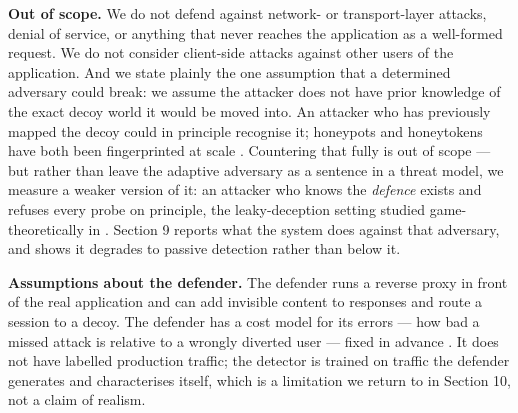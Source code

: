 \textbf{Out of scope.} We do not defend against network- or transport-layer attacks,
denial of service, or anything that never reaches the application as a
well-formed request. We do not consider client-side attacks against other users
of the application. And we state plainly the one assumption that a determined
adversary could break: we assume the attacker does not have prior knowledge of the
exact decoy world it would be moved into. An attacker who has previously mapped
the decoy could in principle recognise it; honeypots and honeytokens have both
been fingerprinted at scale \cite{vetterl2018bitter,srinivasa2020honeytoken}. Countering that fully is out of scope ---
but rather than leave the adaptive adversary as a sentence in a threat model, we
measure a weaker version of it: an attacker who knows the \emph{defence} exists and
refuses every probe on principle, the leaky-deception setting studied
game-theoretically in \cite{pawlick2019leaky}. Section 9 reports what the system does against
that adversary, and shows it degrades to passive detection rather than below it.

\textbf{Assumptions about the defender.} The defender runs a reverse proxy in front of
the real application and can add invisible content to responses and route a
session to a decoy. The defender has a cost model for its errors --- how bad a
missed attack is relative to a wrongly diverted user --- fixed in advance
\cite{elkan2001foundations}. It does
not have labelled production traffic; the detector is trained on traffic the
defender generates and characterises itself, which is a limitation we return to in
Section 10, not a claim of realism.
